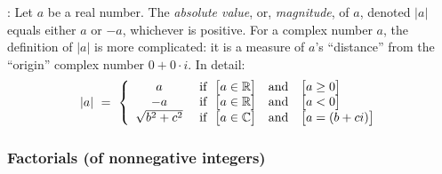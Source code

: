\medskip

:
Let $a$ be a real number.  The {\it absolute value}, or, {\it magnitude}, of $a$, denoted $|a|$ equals either $a$ or $-a$, whichever is positive.  For a complex number $a$, the definition of
$|a|$ is more complicated: it is a measure of $a$'s ``distance'' from the ``origin'' complex number $0 + 0 \cdot i$.  In detail:
\[
|a| \ = \ \left\{
\begin{array}{cl}
a & \mbox{ if } \ \big[a \in \mathbb{R} \big] \ \ \mbox{ and } \ \ \big[a \geq 0\big] \\
-a & \mbox{ if } \ \big[a \in \mathbb{R}\big] \ \ \mbox{ and } \ \ \big[a < 0\big] \\
\sqrt{b^2 + c^2} &  \mbox{ if } \ \big[a \in \mathbb{C}\big]  \ \ \mbox{ and }  \ \ \big[a = (b+ci)\big]
\end{array}
\right.
\]

\subsubsection{Factorials (of nonnegative integers)}


